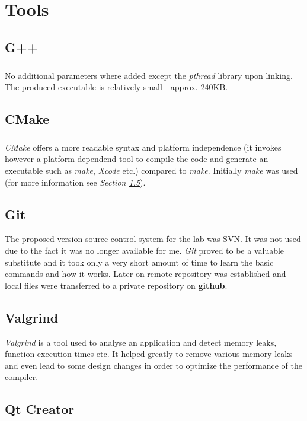 \chapter{Tools}
\paragraph{}
\section{G++}
\paragraph{}
	No additional parameters where added except the \textit{pthread} library upon linking. The produced executable is relatively small - approx. 240KB.
\section{CMake}
\paragraph{}
	\textit{CMake} offers a more readable syntax and platform independence (it invokes however a platform-dependend tool to compile the code and generate an executable such as \textit{make}, \textit{Xcode} etc.) compared to \textit{make}. Initially \textit{make} was used (for more information see \textit{Section \ref{sec:qtcreator}}).
\section{Git}
	The proposed version source control system for the lab was SVN. It was not used due to the fact it was no longer available for me. \textit{Git} proved to be a valuable substitute and it took only a very short amount of time to learn the basic commands and how it works. Later on remote repository was established and local files were transferred to a private repository on \textbf{github}.
\section{Valgrind}
	\textit{Valgrind} is a tool used to analyse an application and detect memory leaks, function execution times etc. It helped greatly to remove various memory leaks and even lead to some design changes in order to optimize the performance of the compiler.
\section{Qt Creator}
\label{sec:qtcreator}
